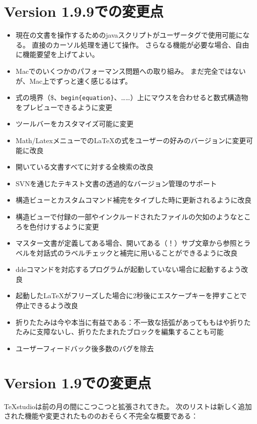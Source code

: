 \section{Version 1.9.9での変更点}

\begin{itemize}
\item
  現在の文書を操作するためのjavaスクリプトがユーザータグで使用可能になる。
  直接のカーソル処理を通じて操作。
  さらなる機能が必要な場合、自由に機能要望を上げてよい。
\item
  Macでのいくつかのパフォーマンス問題への取り組み。
  まだ完全ではないが、Mac上でずっと速く感じるはず。
\item
  式の境界（\$、\verb+begin{equation}+、……）上にマウスを合わせると数式構造物をプレビューできるように変更
\item
  ツールバーをカスタマイズ可能に変更
\item
  Math/LatexメニューでのLaTeXの式をユーザーの好みのバージョンに変更可能に改良
\item
  開いている文書すべてに対する全検索の改良
\item
  SVNを通じたテキスト文書の透過的なバージョン管理のサポート
\item
  構造ビューとカスタムコマンド補完をタイプした時に更新されるように改良
\item
  構造ビューで付録の一部やインクルードされたファイルの欠如のようなところを色付けするように変更
\item
  マスター文書が定義してある場合、開いてある（！）サブ文章から参照とラベルを対話式のラベルチェックと補完に用いることができるように改良
\item
  ddeコマンドを対応するプログラムが起動していない場合に起動するよう改良
\item
  起動したLaTeXがフリーズした場合に2秒後にエスケープキーを押すことで停止できるよう改良
\item
  折りたたみは今や本当に有益である：不一致な括弧があってももはや折りたたみに支障ないし、折りたたまれたブロックを編集することも可能
\item
  ユーザーフィードバック後多数のバグを除去
\end{itemize}

\section{Version 1.9での変更点}

TeXstudioは前の月の間にこつこつと拡張されてきた。
次のリストは新しく追加された機能や変更されたもののおそらく不完全な概要である：

